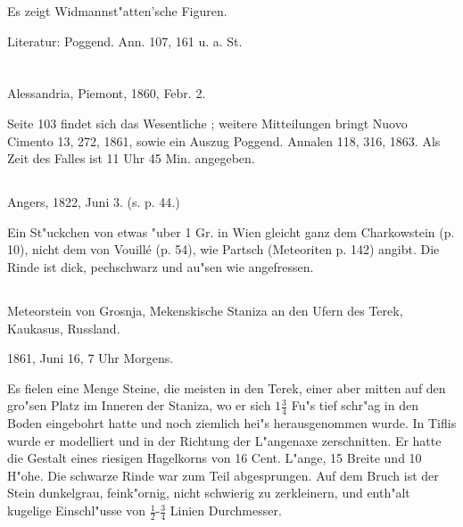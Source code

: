 \documentclass[a4paper, 11pt, oneside]{article}
\begin{document}
Es zeigt Widmannst"atten'sche Figuren.

\normalsize
Literatur: Poggend. Ann. 107, 161 u. a. St.
\clearpage
\section{}

\subsection{}
\LARGE
\paragraph{}
Alessandria, Piemont, 1860, Febr. 2.

Seite 103 findet sich das Wesentliche ; weitere Mitteilungen bringt Nuovo Cimento 13, 272, 1861, sowie ein Auszug Poggend. Annalen 118, 316, 1863. Als Zeit des Falles ist 11 Uhr 45 Min. angegeben.

\subsection{}
\paragraph{}
Angers, 1822, Juni 3. (s. p. 44.)

Ein St"uckchen von etwas "uber 1 Gr. in Wien gleicht ganz dem Charkowstein (p. 10), nicht dem von Vouillé (p. 54), wie Partsch (Meteoriten p. 142) angibt. Die Rinde ist dick, pechschwarz und au"sen wie angefressen.

\subsection{}
\paragraph{}
Meteorstein von Grosnja, Mekenskische Staniza an den Ufern des Terek, Kaukasus, Russland.

1861, Juni 16, 7 Uhr Morgens.

Es fielen eine Menge Steine, die meisten in den Terek, einer aber mitten auf den gro"sen Platz im Inneren der Staniza, wo er sich $\mathfrak{1\frac{3}{4}}$ Fu"s tief schr"ag in den Boden eingebohrt hatte und noch ziemlich hei"s herausgenommen wurde. In Tiflis wurde er modelliert und in der Richtung der L"angenaxe zerschnitten. Er hatte die Gestalt eines riesigen Hagelkorns von 16 Cent. L"ange, 15 Breite und 10 H"ohe. Die schwarze Rinde war zum Teil abgesprungen. Auf dem Bruch ist der Stein dunkelgrau, feink"ornig, nicht schwierig zu zerkleinern, und enth"alt kugelige Einschl"usse von $\mathfrak{\frac{1}{2}}$-$\mathfrak{\frac{3}{4}}$ Linien Durchmesser.
\end{document}
